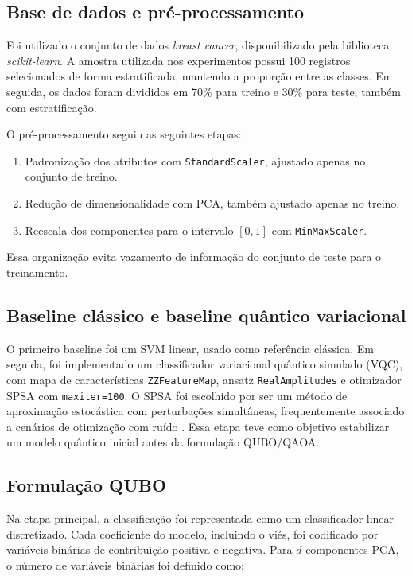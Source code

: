 \documentclass[12pt]{unisenaiclass}
\begin{document}
\subsection{Base de dados e pré-processamento}

Foi utilizado o conjunto de dados \textit{breast cancer}, disponibilizado pela biblioteca \textit{scikit-learn}. A amostra utilizada nos experimentos possui 100 registros selecionados de forma estratificada, mantendo a proporção entre as classes. Em seguida, os dados foram divididos em 70\% para treino e 30\% para teste, também com estratificação.

O pré-processamento seguiu as seguintes etapas:

\begin{enumerate}
    \item Padronização dos atributos com \texttt{StandardScaler}, ajustado apenas no conjunto de treino.
    \item Redução de dimensionalidade com PCA, também ajustado apenas no treino.
    \item Reescala dos componentes para o intervalo \([0,1]\) com \texttt{MinMaxScaler}.
\end{enumerate}

Essa organização evita vazamento de informação do conjunto de teste para o treinamento.

\subsection{Baseline clássico e baseline quântico variacional}

O primeiro baseline foi um SVM linear, usado como referência clássica. Em seguida, foi implementado um classificador variacional quântico simulado (VQC), com mapa de características \texttt{ZZFeatureMap}, ansatz \texttt{RealAmplitudes} e otimizador SPSA com \texttt{maxiter=100}. O SPSA foi escolhido por ser um método de aproximação estocástica com perturbações simultâneas, frequentemente associado a cenários de otimização com ruído \cite{spall1992spsa}. Essa etapa teve como objetivo estabilizar um modelo quântico inicial antes da formulação QUBO/QAOA.

\subsection{Formulação QUBO}

Na etapa principal, a classificação foi representada como um classificador linear discretizado. Cada coeficiente do modelo, incluindo o viés, foi codificado por variáveis binárias de contribuição positiva e negativa. Para \(d\) componentes PCA, o número de variáveis binárias foi definido como:
\end{document}
